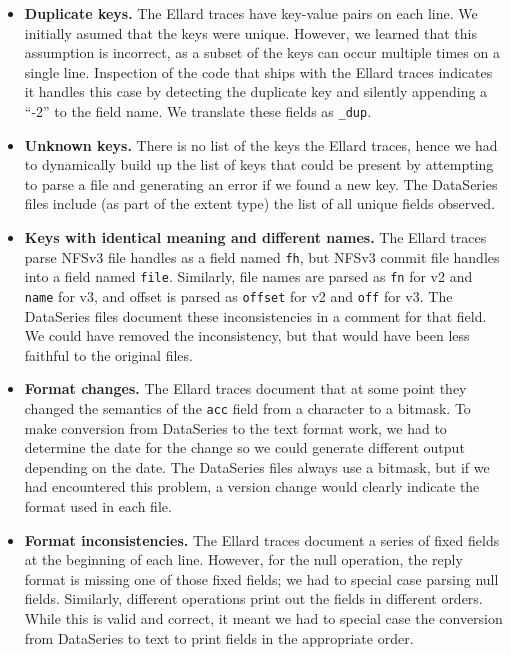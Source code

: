 \begin{itemize}

\item {\bf Duplicate keys.}  The Ellard traces have key-value pairs on
each line.  We initially asumed that the keys were unique.  However,
we learned that this assumption is incorrect, as a subset of the keys
can occur multiple times on a single line.  Inspection of the code
that ships with the Ellard traces indicates it handles this case by
detecting the duplicate key and silently appending a ``-2'' to the
field name.  We translate these fields as \texttt{\_dup}.

\item {\bf Unknown keys.} There is no list of the keys the Ellard
traces, hence we had to dynamically build up the list of keys that
could be present by attempting to parse a file and generating an error
if we found a new key.  The DataSeries files include (as part of the
extent type) the list of all unique fields observed.

\item {\bf Keys with identical meaning and different names.}  The
Ellard traces parse NFSv3 file handles as a field named \texttt{fh},
but NFSv3 commit file handles into a field named \texttt{file}.
Similarly, file names are parsed as \texttt{fn} for v2 and
\texttt{name} for v3, and offset is parsed as \texttt{offset} for v2
and \texttt{off} for v3. The DataSeries files document these
inconsistencies in a comment for that field.  We could have removed
the inconsistency, but that would have been less faithful to the
original files.

\item {\bf Format changes.}  The Ellard traces document that at some
point they changed the semantics of the \texttt{acc} field from a
character to a bitmask.  To make conversion from DataSeries to the
text format work, we had to determine the date for the change so we
could generate different output depending on the date.  The DataSeries
files always use a bitmask, but if we had encountered this problem, a
version change would clearly indicate the format used in each file.

\item {\bf Format inconsistencies.} The Ellard traces document a
series of fixed fields at the beginning of each line.  However, for
the null operation, the reply format is missing one of those fixed
fields; we had to special case parsing null fields.  Similarly,
different operations print out the fields in different orders.  While
this is valid and correct, it meant we had to special case the
conversion from DataSeries to text to print fields in the appropriate
order.


\end{itemize}
